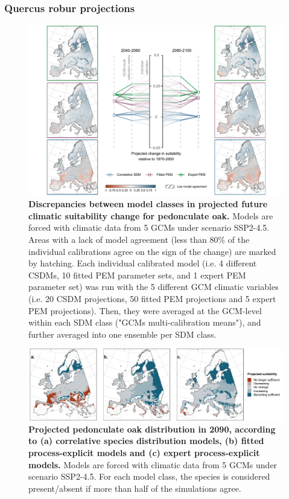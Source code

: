 \subsubsection{Quercus robur projections}

\begin{figure}[htpb]
\centering
\includegraphics{chapter4/figs/quercusrobur_cascade-1.pdf}
\caption{\textbf{Discrepancies between model classes in projected future climatic suitability change for pedonculate oak.} Models are forced with climatic data from 5 GCMs under scenario SSP2-4.5. Areas with a lack of model agreement (less than 80\% of the individual calibrations agree on the sign of the change) are marked by hatching. Each individual calibrated model (i.e. 4 different CSDMs, 10 fitted PEM parameter sets, and 1 expert PEM parameter set) was run with the 5 different GCM climatic variables (i.e. 20 CSDM projections, 50 fitted PEM projections and 5 expert PEM projections). Then, they were averaged at the GCM-level within each SDM class ("GCMs multi-calibration means"), and further averaged into one ensemble per SDM class.}
\label{app:qrobproj}
\end{figure}

\begin{figure}[htpb]
\centering
\vspace*{-0.2cm}
\includegraphics{chapter4/figs/quercusrobur_distributions-1.pdf}
\caption{\textbf{Projected pedonculate oak distribution in 2090, according to (a) correlative species distribution models, (b) fitted process-explicit models and (c) expert process-explicit models.} Models are forced with climatic data from 5 GCMs under scenario SSP2-4.5. For each model class, the species is considered present/absent if more than half of the simulations agree.}
\label{app:qrobdist}
\vspace*{-6cm}
\end{figure}

